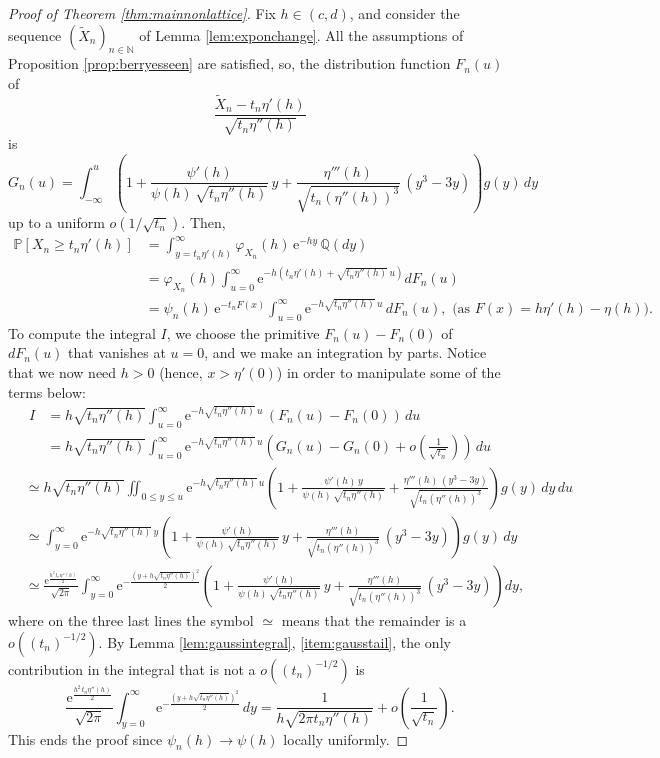 \documentclass[12pt,a4paper,reqno]{amsart}
\theoremstyle{remark}
\newcommand{\N}{\mathbb{N}}
\newcommand{\E}{\mathrm{e}}
\newcommand{\proba}{\mathbb{P}}
\begin{document}
\begin{proof}[Proof of Theorem \ref{thm:mainnonlattice}]
Fix $h \in (c,d)$, and consider the sequence $(\widetilde{X}_n)_{n\in \N}$ of Lemma \ref{lem:exponchange}. All the assumptions of Proposition \ref{prop:berryesseen} are satisfied, so, the distribution function $F_{n}(u)$ of 
$$\frac{\widetilde{X}_{n}-t_{n}\eta'(h)}{\sqrt{t_{n}\eta''(h)}}$$ is 
$$G_{n}(u)=\int_{-\infty}^{u} \left(1+\frac{\psi'(h)}{\psi(h)\,\sqrt{t_{n}\eta''(h)}}\,y+\frac{\eta'''(h)}{\sqrt{t_{n}(\eta''(h))^{3}}}\,(y^{3}-3y)\right)g(y)\,dy$$
up to a uniform $o(1/\sqrt{t_{n}})$. Then,
\begin{align*}\proba[X_{n} \geq t_{n}\eta'(h)]&=\int_{y=t_{n}\eta'(h)}^{\infty}\varphi_{X_{n}}(h)\,\E^{-hy}\,\mathbb{Q}(dy)\\
&=\varphi_{X_{n}}(h)\int_{u=0}^{\infty} \E^{-h\left(t_{n}\eta'(h)+\sqrt{t_{n}\eta''(h)}\,u\right)} dF_{n}(u)\\
&=\psi_{n}(h)\,\E^{-t_{n}F(x)}\int_{u=0}^{\infty} \E^{-h\sqrt{t_{n}\eta''(h)}\,u}\, dF_{n}(u), \,\, \text{(as $F(x)=h\eta'(h)-\eta(h)$).}
\end{align*}
To compute the integral $I$, we choose the primitive $F_n(u)-F_n(0)$ of $dF_{n}(u)$ that vanishes at $u=0$, and we make an integration by parts. Notice that we now need $h>0$ (hence, $x>\eta'(0)$) in order to manipulate some of the terms below:
\begin{align*}
I&=h\sqrt{t_{n}\eta''(h)}\int_{u=0}^{\infty}\E^{-h\sqrt{t_{n}\eta''(h)}\,u}\,(F_{n}(u)-F_n(0))\,du\\
&= h\sqrt{t_{n}\eta''(h)}\int_{u=0}^{\infty}\E^{-h\sqrt{t_{n}\eta''(h)}\,u}\left(G_{n}(u)-G_{n}(0)+o\!\left(\frac{1}{\sqrt{t_{n}}}\right)\!\right)\,du\end{align*}
\begin{align*}
&\simeq h\sqrt{t_{n}\eta''(h)} \iint_{0\leq y \leq u} \!\!\!\!\!\!\!\!\!\E^{-h\sqrt{t_{n}\eta''(h)}\,u}\!\left(1+\frac{\psi'(h)\,y}{\psi(h)\,\sqrt{t_{n}\eta''(h)}}+\frac{\eta'''(h)\,(y^{3}-3y)}{\sqrt{t_{n}(\eta''(h))^{3}}}\right)g(y)\,dy\,du \\
&\simeq \int_{y=0}^{\infty} \E^{-h\sqrt{t_{n}\eta''(h)}\,y}\left(1+\frac{\psi'(h)}{\psi(h)\,\sqrt{t_{n}\eta''(h)}}\,y+\frac{\eta'''(h)}{\sqrt{t_{n}(\eta''(h))^{3}}}\,(y^{3}-3y)\right)g(y)\,dy\\
&\simeq \frac{\E^{\frac{h^2\, t_n\eta''(h)}{2}}}{\sqrt{2\pi}}\int_{y=0}^{\infty} \E^{-\frac{(y+h\sqrt{t_{n}\eta''(h)})^2}{2}}\left(1+\frac{\psi'(h)}{\psi(h)\,\sqrt{t_{n}\eta''(h)}}\,y+\frac{\eta'''(h)}{\sqrt{t_{n}(\eta''(h))^{3}}}\,(y^{3}-3y)\right)dy,
\end{align*}
where on the three last lines the symbol $\simeq$ means that the remainder is a $o((t_{n})^{-1/2})$. By Lemma \ref{lem:gaussintegral}, \eqref{item:gausstail}, the only contribution in the integral that is not a $o((t_{n})^{-1/2})$ is $$\frac{\E^{\frac{h^2\, t_n\eta''(h)}{2}}}{\sqrt{2\pi}}\int_{y=0}^{\infty} \E^{-\frac{(y+h\sqrt{t_{n}\eta''(h)})^2}{2}}\,dy=\frac{1}{h\sqrt{2\pi t_{n}\eta''(h)}}+o\!\left(\frac{1}{\sqrt{t_{n}}}\right).$$ This ends the proof since $\psi_{n}(h)\to\psi(h)$ locally uniformly.
\end{proof}\bigskip
\end{document}
